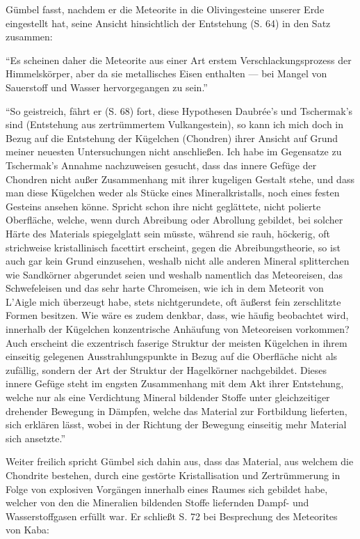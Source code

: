 \documentclass[a4paper, 12pt, oneside]{article}
\begin{document}
Gümbel fasst, nachdem er die Meteorite in die Olivingesteine unserer Erde eingestellt hat, seine Ansicht hinsichtlich der Entstehung (S. 64) in den Satz zusammen:

"`Es scheinen daher die Meteorite aus einer Art erstem Verschlackungsprozess der Himmelskörper, aber da sie metallisches Eisen enthalten — bei Mangel von Sauerstoff und Wasser hervorgegangen zu sein."'

"`So geistreich, fährt er (S. 68) fort, diese Hypothesen Daubrée's und Tschermak's sind (Entstehung aus zertrümmertem Vulkangestein), so kann ich mich doch in Bezug auf die Entstehung der Kügelchen (Chondren) ihrer Ansicht auf Grund meiner neuesten Untersuchungen nicht anschließen. Ich habe im Gegensatze zu Tschermak's Annahme nachzuweisen gesucht, dass das innere Gefüge der Chondren nicht außer Zusammenhang mit ihrer kugeligen Gestalt stehe, und dass man diese Kügelchen weder als Stücke eines Mineralkristalls, noch eines festen Gesteins ansehen könne. Spricht schon ihre nicht geglättete, nicht polierte Oberfläche, welche, wenn durch Abreibung oder Abrollung gebildet, bei solcher Härte des Materials spiegelglatt sein müsste, während sie rauh, höckerig, oft strichweise kristallinisch facettirt erscheint, gegen die Abreibungstheorie, so ist auch gar kein Grund einzusehen, weshalb nicht alle anderen Mineral splitterchen wie Sandkörner abgerundet seien und weshalb namentlich das Meteoreisen, das Schwefeleisen und das sehr harte Chromeisen, wie ich in dem Meteorit von L'Aigle mich überzeugt habe, stets nichtgerundete, oft äußerst fein zerschlitzte Formen besitzen. Wie wäre es zudem denkbar, dass, wie häufig beobachtet wird, innerhalb der Kügelchen konzentrische Anhäufung von Meteoreisen vorkommen? Auch erscheint die exzentrisch faserige Struktur der meisten Kügelchen in ihrem einseitig gelegenen Ausstrahlungspunkte in Bezug auf die Oberfläche nicht als zufällig, sondern der Art der Struktur der Hagelkörner nachgebildet. Dieses innere Gefüge steht im engsten Zusammenhang mit dem Akt ihrer Entstehung, welche nur als eine Verdichtung Mineral bildender Stoffe unter gleichzeitiger drehender Bewegung in Dämpfen, welche das Material zur Fortbildung lieferten, sich erklären lässt, wobei in der Richtung der Bewegung einseitig mehr Material sich ansetzte."'

Weiter freilich spricht Gümbel sich dahin aus, dass das Material, aus welchem die Chondrite bestehen, durch eine gestörte Kristallisation und Zertrümmerung in Folge von explosiven Vorgängen innerhalb eines Raumes sich gebildet habe, welcher von den die Mineralien bildenden Stoffe liefernden Dampf- und Wasserstoffgasen erfüllt war. Er schließt S. 72 bei Besprechung des Meteorites von Kaba:
\end{document}
